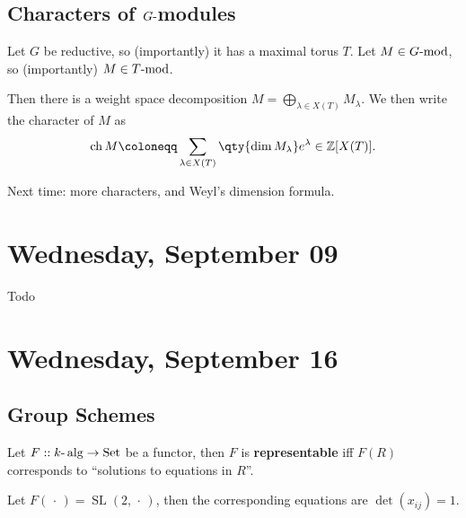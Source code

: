 \hypertarget{characters-of-ghbox-modules}{%
\subsection{\texorpdfstring{Characters of
\(G{\hbox{-}}\)modules}{Characters of G\{\textbackslash hbox\{-\}\}modules}}\label{characters-of-ghbox-modules}}

Let \(G\) be reductive, so (importantly) it has a maximal torus \(T\).
Let \(M\in G{\hbox{-}}\mathrm{mod}\), so (importantly)
\(M\in T{\hbox{-}}\mathrm{mod}\).

Then there is a weight space decomposition
\(M = \bigoplus_{\lambda \in X(T)} M_\lambda\). We then write the
character of \(M\) as
\begin{align*}  
\operatorname{ch}M \coloneqq\sum_{\lambda \in X(T)} \qty{\dim M_\lambda} e^{\lambda} \in {\mathbb{Z}}[X(T)]
.\end{align*}

Next time: more characters, and Weyl's dimension formula.

\hypertarget{wednesday-september-09}{%
\section{Wednesday, September 09}\label{wednesday-september-09}}

Todo

\hypertarget{wednesday-september-16}{%
\section{Wednesday, September 16}\label{wednesday-september-16}}

\hypertarget{group-schemes}{%
\subsection{Group Schemes}\label{group-schemes}}

\begin{definition}

Let \(F:: k{\hbox{-}}\operatorname{alg}\to {\operatorname{Set}}\) be a
functor, then \(F\) is \textbf{representable} iff \(F(R)\) corresponds
to ``solutions to equations in \(R\)''.

\end{definition}

\begin{example}

Let \(F({\,\cdot\,}) = {\operatorname{SL}}(2, {\,\cdot\,})\), then the
corresponding equations are \(\det (x_{ij}) = 1\).

\end{example}

